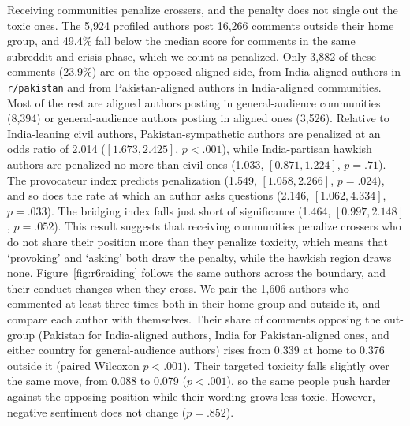 Receiving communities penalize crossers, and the penalty does not single out the toxic ones. The 5,924 profiled authors post 16,266 comments outside their home group, and 49.4\% fall below the median score for comments in the same subreddit and crisis phase, which we count as penalized. Only 3,882 of these comments (23.9\%) are on the opposed-aligned side, from India-aligned authors in \texttt{r/pakistan} and from Pakistan-aligned authors in India-aligned communities. Most of the rest are aligned authors posting in general-audience communities (8,394) or general-audience authors posting in aligned ones (3,526). Relative to India-leaning civil authors, Pakistan-sympathetic authors are penalized at an odds ratio of 2.014 ($[1.673, 2.425]$, $p < .001$), while India-partisan hawkish authors are penalized no more than civil ones (1.033, $[0.871, 1.224]$, $p = .71$). The provocateur index predicts penalization (1.549, $[1.058, 2.266]$, $p = .024$), and so does the rate at which an author asks questions (2.146, $[1.062, 4.334]$, $p = .033$). The bridging index falls just short of significance (1.464, $[0.997, 2.148]$, $p = .052$). This result suggests that receiving communities penalize crossers who do not share their position more than they penalize toxicity, which means that `provoking' and `asking' both draw the penalty, while the hawkish region draws none.
Figure~\ref{fig:r6raiding} follows the same authors across the boundary, and their conduct changes when they cross. We pair the 1,606 authors who commented at least three times both in their home group and outside it, and compare each author with themselves. Their share of comments opposing the out-group (Pakistan for India-aligned authors, India for Pakistan-aligned ones, and either country for general-audience authors) rises from 0.339 at home to 0.376 outside it (paired Wilcoxon $p < .001$). Their targeted toxicity falls slightly over the same move, from 0.088 to 0.079 ($p < .001$), so the same people push harder against the opposing position while their wording grows less toxic. However, negative sentiment does not change ($p = .852$).

